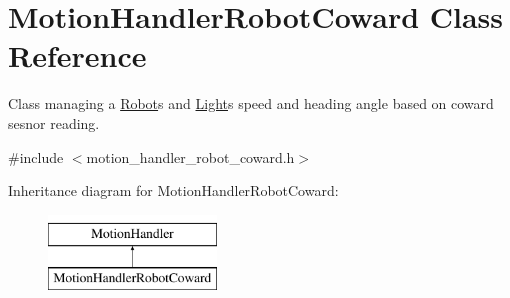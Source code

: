 \hypertarget{class_motion_handler_robot_coward}{}\section{Motion\+Handler\+Robot\+Coward Class Reference}
\label{class_motion_handler_robot_coward}


Class managing a \hyperlink{class_robot}{Robot}\textquotesingle{}s and \hyperlink{class_light}{Light}\textquotesingle{}s speed and heading angle based on coward sesnor reading.  




{\ttfamily \#include $<$motion\+\_\+handler\+\_\+robot\+\_\+coward.\+h$>$}

Inheritance diagram for Motion\+Handler\+Robot\+Coward\+:\begin{figure}[H]
\begin{center}
\leavevmode
\includegraphics[height=2.000000cm]{class_motion_handler_robot_coward}
\end{center}
\end{figure}
